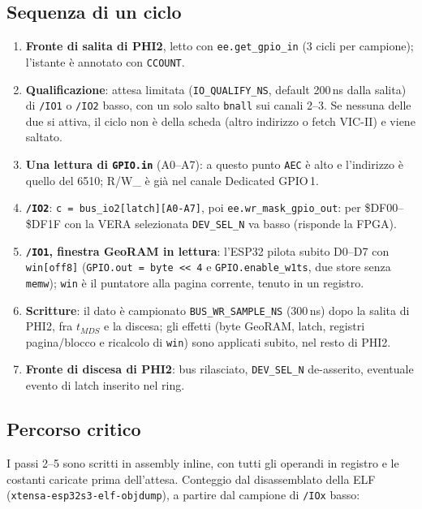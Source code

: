 \documentclass[12pt, a4paper]{article}
\begin{document}
\subsection{Sequenza di un ciclo}
\begin{enumerate}
    \item \textbf{Fronte di salita di PHI2}, letto con \texttt{ee.get\_gpio\_in} (3 cicli per campione); l'istante è annotato con \texttt{CCOUNT}.
    \item \textbf{Qualificazione}: attesa limitata (\texttt{IO\_QUALIFY\_NS}, default 200\,ns dalla salita) di \texttt{/IO1} o \texttt{/IO2} basso, con un solo salto \texttt{bnall} sui canali 2--3. Se nessuna delle due si attiva, il ciclo non è della scheda (altro indirizzo o fetch VIC-II) e viene saltato.
    \item \textbf{Una lettura di \texttt{GPIO.in}} (A0--A7): a questo punto \texttt{AEC} è alto e l'indirizzo è quello del 6510; R/W\_ è già nel canale Dedicated GPIO\,1.
    \item \textbf{\texttt{/IO2}}: \texttt{c = bus\_io2[latch][A0-A7]}, poi \texttt{ee.wr\_mask\_gpio\_out}: per \$DF00--\$DF1F con la VERA selezionata \texttt{DEV\_SEL\_N} va basso (risponde la FPGA).
    \item \textbf{\texttt{/IO1}, finestra GeoRAM in lettura}: l'ESP32 pilota subito D0--D7 con \texttt{win[off8]} (\texttt{GPIO.out = byte << 4} e \texttt{GPIO.enable\_w1ts}, due store senza \texttt{memw}); \texttt{win} è il puntatore alla pagina corrente, tenuto in un registro.
    \item \textbf{Scritture}: il dato è campionato \texttt{BUS\_WR\_SAMPLE\_NS} (300\,ns) dopo la salita di PHI2, fra $t_{MDS}$ e la discesa; gli effetti (byte GeoRAM, latch, registri pagina/blocco e ricalcolo di \texttt{win}) sono applicati subito, nel resto di PHI2.
    \item \textbf{Fronte di discesa di PHI2}: bus rilasciato, \texttt{DEV\_SEL\_N} de-asserito, eventuale evento di latch inserito nel ring.
\end{enumerate}

\subsection{Percorso critico}
I passi 2--5 sono scritti in assembly inline, con tutti gli operandi in registro e le costanti caricate prima dell'attesa. Conteggio dal disassemblato della ELF (\texttt{xtensa-esp32s3-elf-objdump}), a partire dal campione di \texttt{/IOx} basso:
\end{document}
